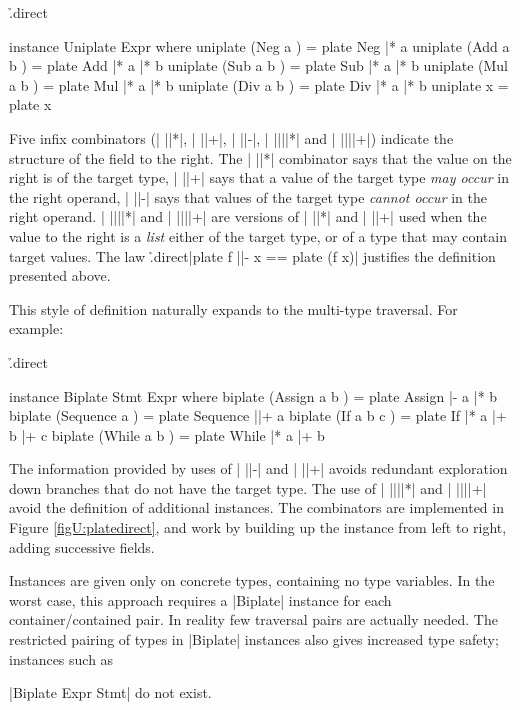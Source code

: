 \h{.direct}\begin{code}
instance Uniplate Expr where
    uniplate (Neg  a    )  = plate Neg  |* a
    uniplate (Add  a b  )  = plate Add  |* a |* b
    uniplate (Sub  a b  )  = plate Sub  |* a |* b
    uniplate (Mul  a b  )  = plate Mul  |* a |* b
    uniplate (Div  a b  )  = plate Div  |* a |* b
    uniplate x             = plate x
\end{code}

Five infix combinators (| ||*|, | ||+|, | ||-|, | ||||*| and | ||||+|) indicate the structure of the field to the right. The | ||*| combinator says that the value on the right is of the target type, | ||+| says that a value of the target type \textit{may occur} in the right operand, | ||-| says that values of the target type \textit{cannot occur} in the right operand. | ||||*| and | ||||+| are versions of | ||*| and | ||+| used when the value to the right is a \textit{list} either of the target type, or of a type that may contain target values. The law \h{.direct}|plate f ||- x == plate (f x)| justifies the definition presented above.

This style of definition naturally expands to the multi-type traversal. For example:

\begin{onepage}
\h{.direct}\begin{code}
instance Biplate Stmt Expr where
    biplate (Assign    a b    ) = plate Assign    |-   a |*  b
    biplate (Sequence  a      ) = plate Sequence  ||+  a
    biplate (If        a b c  ) = plate If        |*   a |+  b |+ c
    biplate (While     a b    ) = plate While     |*   a |+  b
\end{code}
\end{onepage}

The information provided by uses of | ||-| and | ||+| avoids redundant exploration down branches that do not have the target type. The use of | ||||*| and | ||||+| avoid the definition of additional instances. The combinators are implemented in Figure \ref{figU:platedirect}, and work by building up the instance from left to right, adding successive fields.

Instances are given only on concrete types, containing no type variables. In the worst case, this approach requires a |Biplate| instance for each container/contained pair. In reality few traversal pairs are actually needed. The restricted pairing of types in |Biplate| instances also gives increased type safety; instances such as \ignore|Biplate Expr Stmt| do not exist.

